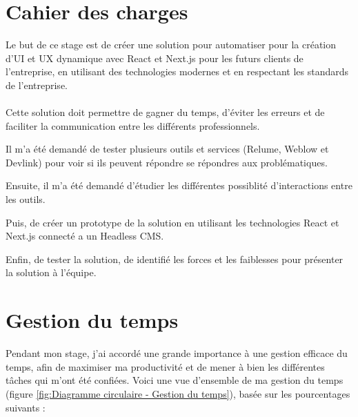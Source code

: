 \section{Cahier des charges}
Le but de ce stage est de créer une solution pour automatiser pour la création d'UI et UX dynamique avec React et Next.js pour les futurs clients de l'entreprise, en utilisant des technologies modernes et en respectant les standards de l'entreprise. 
\\ \\
Cette solution doit permettre de gagner du temps, d'éviter les erreurs et de faciliter la communication entre les différents professionnels.

Il m'a été demandé de tester plusieurs outils et services (Relume, Weblow et Devlink) pour voir si ils peuvent répondre se répondres aux problématiques.

Ensuite, il m'a été demandé d'étudier les différentes possiblité d'interactions entre les outils. 

Puis, de créer un prototype de la solution en utilisant les technologies React et Next.js connecté a un Headless CMS.

Enfin, de tester la solution, de identifié les forces et les faiblesses pour présenter la solution à l'équipe.

\section{Gestion du temps}

Pendant mon stage, j'ai accordé une grande importance à une gestion efficace du temps, afin de maximiser ma productivité et de mener à bien les différentes tâches qui m'ont été confiées. Voici une vue d'ensemble de ma gestion du temps (figure \ref{fig:Diagramme circulaire - Gestion du temps}), basée sur les pourcentages suivants :

